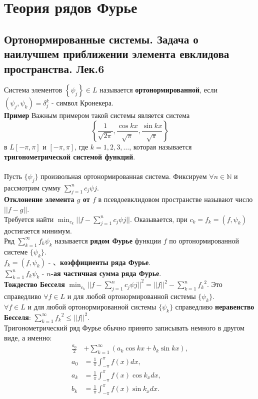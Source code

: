 \documentclass{article}
\begin{document}
	 
\section{Теория рядов Фурье}
\subsection{Ортонормированные системы. Задача о наилучшем приближении элемента евклидова пространства. Лек.6}
	Система элементов $ \left\{\psi_{j}\right\} \in L $ называется \textbf{ортонормированной}, если $ \left(\psi_{j}, \psi_{k}\right)=\delta_{j}^{k} $ - символ Кронекера.\\	
	\textbf{Пример} Важным примером такой системы является система
	\begin{equation}
	\label{1-1}
	\left\{\frac{1}{\sqrt{2 \pi}}, \frac{\cos k x}{\sqrt{\pi}}, \frac{\sin k x}{\sqrt{\pi}}\right\}
	\end{equation}
	в $L[-\pi, \pi] $ и $ [-\pi, \pi]$, где $ k=1,2,3, \ldots$, которая называется \textbf{тригонометрической системой функций}.\\
	\\
	Пусть $\{{\psi}_{j}\}$ произвольная ортонормированная система. Фиксируем $\forall n\in \mathbb{N}$ и рассмотрим сумму $\sum_{j=1}^{n} {c}_{j}{\psi}{j}$.\\
	\textbf{Отклонение элемента $g$ от $f$} в псевдоевклидовом пространстве называют число $||f-g||$.\\
	Требуется найти $\min_{{c}_{k}} ||f-\sum_{j=1}^{n} {c}_{j}{\psi}{j}||$. Оказывается, при ${c}_{k}={f}_{k}=(f,{\psi}_{k})$ достигается минимум.\\
	Ряд $\sum_{k=1}^{\infty} {f}_{k}{\psi}_{k}$ называется \textbf{рядом Фурье} функции $f$ по ортонормированной системе $\{{\psi}_{k}\}$.\\
	${f}_{k}=(f,{\psi}_{k})$ - 、\textbf{коэффициенты ряда Фурье}.\\
	$\sum_{k=1}^{n} {f}_{k}{\psi}_{k}$ - \textbf{$n$-ая частичная сумма ряда Фурье}.\\
	\textbf{Тождество Бесселя} $\min_{{c}_{k}} {||f-\sum_{j=1}^{n} {c}_{j}{\psi}{j}||}^{2}={||f||}^{2}-\sum_{k=1}^{n}{{f}_{k}}^{2}$. Это справедливо $\forall f\in L$ и для любой ортонормированной системы $\{{\psi}_{k}\}$.\\
	$\forall f\in L$ и для любой ортонормированной системы $\{{\psi}_{k}\}$ справедливо \textbf{неравенство Бесселя}: $\sum_{k=1}^{\infty}{{f}_{k}}^{2}\le {||f||}^{2}$.\\
	Тригонометрический ряд Фурье обычно принято записывать немного в другом виде, а именно:
	\begin{equation}
	\label{1-2}
	\begin{aligned}
	\frac{{a}_{0}}{2}&+\sum_{k=1}^{\infty} ({a}_{k} \cos kx+{b}_{k} \sin kx),\\
	{a}_{0}&=\frac{1}{\pi} \int_{-\pi}^{\pi} f(x)dx,\\ {a}_{k}&=\frac{1}{\pi} \int_{-\pi}^{\pi} f(x)\cos{k}_{x}dx,\\
	{b}_{k}&=\frac{1}{\pi} \int_{-\pi}^{\pi} f(x)\sin{k}_{x}dx.
	\end{aligned}
	\end{equation}
	
\end{document}
